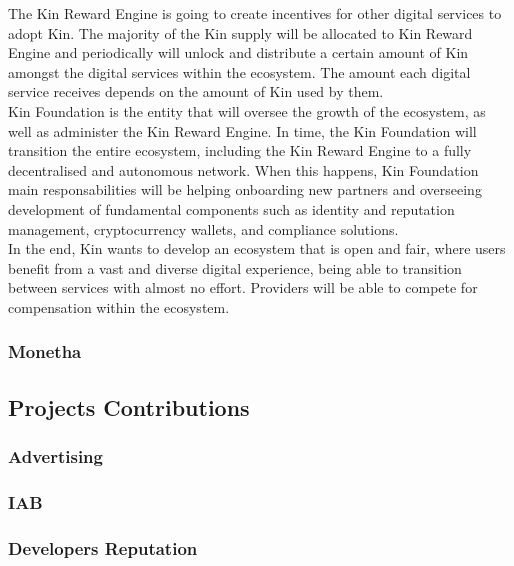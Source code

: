 The Kin Reward Engine is going to create incentives for other digital services to adopt Kin. The majority of the Kin supply will be allocated to Kin Reward Engine and periodically will unlock and distribute a certain amount of Kin amongst the digital services within the ecosystem. The amount each digital service receives depends on the amount of Kin used by them. \\

Kin Foundation is the entity that will oversee the growth of the ecosystem, as well as administer the Kin Reward Engine. In time, the Kin Foundation will transition the entire ecosystem, including the Kin Reward Engine to a fully decentralised and autonomous network. When this happens, Kin Foundation main responsabilities will be helping onboarding new partners and overseeing development of fundamental components such as identity and reputation management, cryptocurrency wallets, and compliance solutions. \\

In the end, Kin wants to develop an ecosystem that is open and fair, where users benefit from a vast and diverse digital experience, being able to transition between services with almost no effort. Providers will be able to compete for compensation within the ecosystem.

\subsubsection{Monetha}



\subsection{Projects Contributions}
\subsubsection{Advertising}

\subsubsection{IAB}

\subsubsection{Developers Reputation}






